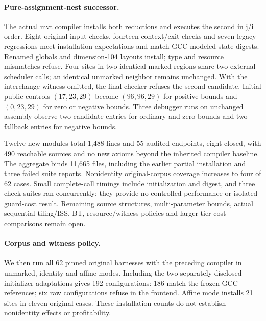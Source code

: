 \paragraph{Pure-assignment-nest successor.}
The actual mvt compiler installs both reductions and executes the second in
j/i order. Eight original-input checks, fourteen context/exit checks and seven
legacy regressions meet installation expectations and match GCC modeled-state
digests. Renamed globals and dimension-104 layouts install; type and resource
mismatches refuse. Four sites in two identical marked regions share two
external scheduler calls; an identical unmarked neighbor remains unchanged.
With the interchange witness omitted, the final checker refuses the second
candidate. Initial public controls $(17,23,29)$ become $(96,96,29)$ for positive
bounds and $(0,23,29)$ for zero or negative bounds. Three debugger runs on
unchanged assembly observe two candidate entries for ordinary and zero bounds
and two fallback entries for negative bounds.

Twelve new modules total 1,488 lines and 55 audited endpoints, eight closed,
with 490 reachable sources and no new axioms beyond the inherited compiler
baseline. The aggregate binds 11,665 files, including the earlier partial
installation and three failed suite reports. Nonidentity original-corpus
coverage increases to four of 62 cases. Small complete-call timings include
initialization and digest, and three check suites ran concurrently; they
provide no controlled performance or isolated guard-cost result. Remaining
source structures, multi-parameter bounds, actual sequential tiling/ISS, BT,
resource/witness policies and larger-tier cost comparisons remain open.

\paragraph{Corpus and witness policy.}
We then run all 62 pinned original harnesses with the preceding compiler in
unmarked, identity and affine modes. Including the two separately disclosed
initializer adaptations gives 192 configurations: 186 match the frozen GCC
references; six raw configurations refuse in the frontend. Affine mode installs
21 sites in eleven original cases. These installation counts do not establish
nonidentity effects or profitability.

